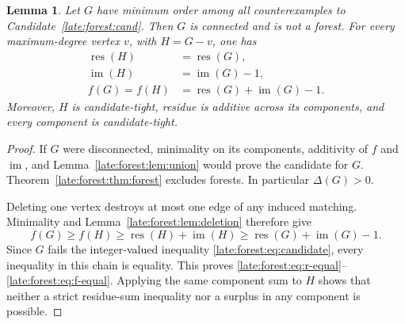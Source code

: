 \documentclass[11pt,a4paper]{article}
\newtheorem{lemma}[theorem]{Lemma}
\theoremstyle{definition}\newtheorem{definition}[theorem]{Definition}
\theoremstyle{remark}\newtheorem{remark}[theorem]{Remark}
\newcommand{\res}{\operatorname{res}}
\newcommand{\im}{\operatorname{im}}
\begin{document}
\begin{lemma}\label{late:forest:lem:tightdelete}
Let $G$ have minimum order among all counterexamples to
Candidate~\ref{late:forest:cand}. Then $G$ is connected and is not a forest. For every
maximum-degree vertex $v$, with $H=G-v$, one has
\begin{align}
\res(H)&=\res(G),\label{late:forest:eq:r-equal}\\
\im(H)&=\im(G)-1,\label{late:forest:eq:im-equal}\\
f(G)=f(H)&=\res(G)+\im(G)-1.\label{late:forest:eq:f-equal}
\end{align}
Moreover, $H$ is candidate-tight, residue is additive across its components,
and every component is candidate-tight.
\end{lemma}
\begin{proof}
If $G$ were disconnected, minimality on its components, additivity of $f$ and
$\im$, and Lemma~\ref{late:forest:lem:union} would prove the candidate for $G$.
Theorem~\ref{late:forest:thm:forest} excludes forests. In particular $\Delta(G)>0$.

Deleting one vertex destroys at most one edge of any induced matching.
Minimality and Lemma~\ref{late:forest:lem:deletion} therefore give
\[
f(G)\ge f(H)\ge \res(H)+\im(H)
\ge \res(G)+\im(G)-1.
\]
Since $G$ fails the integer-valued inequality \eqref{late:forest:eq:candidate}, every
inequality in this chain is equality. This proves
\eqref{late:forest:eq:r-equal}--\eqref{late:forest:eq:f-equal}. Applying the same component sum to
$H$ shows that neither a strict residue-sum inequality nor a surplus in any
component is possible.
\end{proof}
\end{document}

